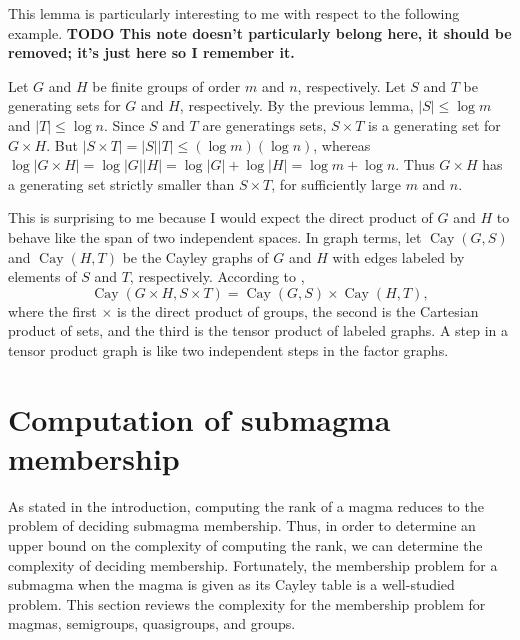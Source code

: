 \documentclass{article}
\newcommand{\todo}[1]{\textbf{TODO #1}}
\DeclareMathOperator{\Cay}{Cay}
\begin{document}
\begin{example}
  This lemma is particularly interesting to me with respect to the following example.
  \todo{This note doesn't particularly belong here, it should be removed; it's just here so I remember it.}

  Let $G$ and $H$ be finite groups of order $m$ and $n$, respectively.
  Let $S$ and $T$ be generating sets for $G$ and $H$, respectively.
  By the previous lemma, $|S| \leq \log m$ and $|T| \leq \log n$.
  Since $S$ and $T$ are generatings sets, $S \times T$ is a generating set for $G \times H$.
  But $|S \times T| = |S| |T| \leq (\log m) (\log n)$, whereas $\log |G \times H| = \log |G| |H| = \log |G| + \log |H| = \log m + \log n$.
  Thus $G \times H$ has a generating set strictly smaller than $S \times T$, for sufficiently large $m$ and $n$.

  This is surprising to me because I would expect the direct product of $G$ and $H$ to behave like the span of two independent spaces.
  In graph terms, let $\Cay(G, S)$ and $\Cay(H, T)$ be the Cayley graphs of $G$ and $H$ with edges labeled by elements of $S$ and $T$, respectively.
  According to \autocite[Proposition~7]{heydemann97},
  \begin{equation*}
    \Cay(G \times H, S \times T) = \Cay(G, S) \times \Cay(H, T),
  \end{equation*}
  where the first $\times$ is the direct product of groups, the second is the Cartesian product of sets, and the third is the tensor product of labeled graphs.
  A step in a tensor product graph is like two independent steps in the factor graphs.
\end{example}

\section{Computation of submagma membership}
%
As stated in the introduction, computing the rank of a magma reduces to the problem of deciding submagma membership.
Thus, in order to determine an upper bound on the complexity of computing the rank, we can determine the complexity of deciding membership.
%
Fortunately, the membership problem for a submagma when the magma is given as its Cayley table is a well-studied problem.
This section reviews the complexity for the membership problem for magmas, semigroups, quasigroups, and groups.
\end{document}
